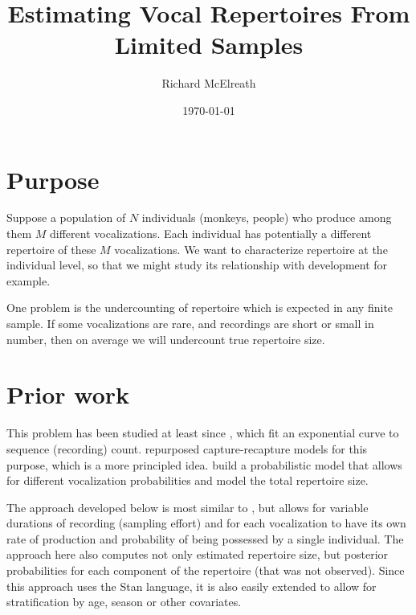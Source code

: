\documentclass[reqno ,11pt]{amsart}
\begin{document}
\title[Vocal Repertoires]{\large Estimating Vocal Repertoires From Limited Samples}
\author{Richard McElreath}
\address{Department of Human Behavior, Ecology and Culture, Max Planck Institute for Evolutionary Anthropology, Deutscher Platz 6, 04103 Leipzig, Germany}
\date{\today}

\maketitle


\linenumbers
\modulolinenumbers[5]

\section{Purpose}

Suppose a population of $N$ individuals (monkeys, people) who produce among them $M$ different vocalizations. Each individual has potentially a different repertoire of these $M$ vocalizations. We want to characterize repertoire at the individual level, so that we might study its relationship with development for example. 

One problem is the undercounting of repertoire which is expected in any finite sample. If some vocalizations are rare, and recordings are short or small in number, then on average we will undercount true repertoire size. 

\section{Prior work}

This problem has been studied at least since \cite{Wildenthal1965}, which fit an exponential curve to sequence (recording) count. \cite{Garamszegi2004} repurposed capture-recapture models for this purpose, which is a more principled idea. \cite{Kershenbaum2015} build a probabilistic model that allows for different vocalization probabilities and model the total repertoire size. 

The approach developed below is most similar to \cite{Kershenbaum2015}, but allows for variable durations of recording (sampling effort) and for each vocalization to have its own rate of production and probability of being possessed by a single individual. The approach here also computes not only estimated repertoire size, but posterior probabilities for each component of the repertoire (that was not observed). Since this approach uses the Stan language, it is also easily extended to allow for stratification by age, season or other covariates.
\end{document}
